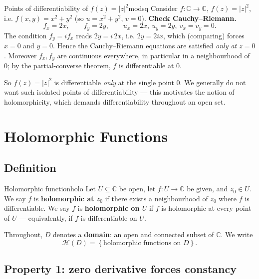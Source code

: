 \documentclass[11pt,openany]{report}
\newcommand{\C}{\mathbb{C}}
\newcommand{\abs}[1]{\left\lvert #1 \right\rvert}
\newcommand{\set}[1]{\left\{ #1 \right\}}
\newcommand{\Hol}{\mathcal{H}}
\begin{document}
\begin{example}{Points of differentiability of $f(z)=\abs{z}^2$}{modsq}
Consider $f:\C\to\C$, $f(z)=\abs{z}^2$, i.e. $f(x,y)=x^2+y^2$ (so $u=x^2+y^2$, $v=0$).
\textbf{Check Cauchy--Riemann.}
\[
  f_x = 2x, \qquad f_y = 2y, \qquad u_x=2x,\ u_y=2y,\ v_x=v_y=0.
\]
The condition $f_y = i f_x$ reads $2y = i\,2x$, i.e. $2y = 2ix$, which (comparing) forces
$x=0$ and $y=0$. Hence the Cauchy--Riemann equations are satisfied \emph{only at $z=0$}.
Moreover $f_x,f_y$ are continuous everywhere, in particular in a neighbourhood of $0$; by
the partial-converse theorem, $f$ is differentiable at $0$.
\end{example}

\begin{remark}
So $f(z)=\abs{z}^2$ is differentiable \emph{only} at the single point $0$. We generally do
not want such isolated points of differentiability --- this motivates the notion of
holomorphicity, which demands differentiability throughout an open set.
\end{remark}


\chapter{Holomorphic Functions}

\section{Definition}

\begin{definition}{Holomorphic function}{holo}
Let $U\subseteq\C$ be open, let $f:U\to\C$ be given, and $z_0\in U$. We say $f$ is
\textbf{holomorphic at $z_0$} if there exists a neighbourhood of $z_0$ where $f$ is
differentiable. We say $f$ is \textbf{holomorphic on $U$} if $f$ is holomorphic at every
point of $U$ --- equivalently, if $f$ is differentiable on $U$.
\end{definition}

Throughout, $D$ denotes a \textbf{domain}: an open and connected subset of $\C$. We write
\[
  \Hol(D) = \set{ \text{holomorphic functions on } D }.
\]

\section{Property 1: zero derivative forces constancy}
\end{document}
